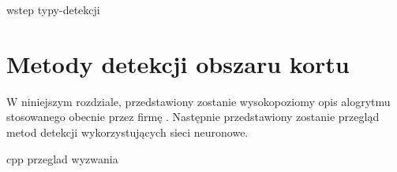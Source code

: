 {wstep}
{typy-detekcji}

\section{Metody detekcji obszaru kortu}
\label{sec:metody_detekcji}

W niniejszym rozdziale, przedstawiony zostanie wysokopoziomy opis alogrytmu stosowanego obecnie przez firmę \blue{}. Następnie przedstawiony zostanie przegląd metod detekcji wykorzystujących sieci neuronowe.

{cpp}
{przeglad}
{wyzwania}
